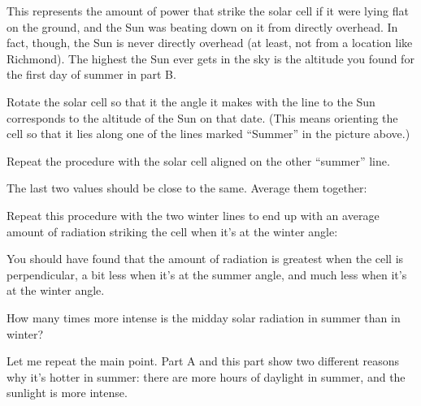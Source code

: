 \vskip 1in

This represents the amount of power that strike the solar cell
if it were lying flat on the ground, and the Sun was beating down
on it from directly overhead. In fact, though, the Sun is never
directly overhead (at least, not from a location like Richmond).
The highest the Sun ever gets in the sky is the altitude you found
for the first day of summer in part B.

Rotate the solar cell so that it the angle it makes with
the line to the Sun corresponds to the altitude of the
Sun on that date. (This means orienting the cell so that it
lies along one of the lines marked ``Summer'' in the picture above.)

\vskip 1in

Repeat the procedure with the solar cell aligned on the other ``summer''
line.  

\vskip 1in

The last two values should be close to the same.  Average them
together:

\vskip 1in

Repeat this procedure with the two winter lines to end
up with an average amount of radiation striking the cell
when it's at the winter angle:

\vskip 2in

You should have found that the amount of radiation is greatest
when the cell is perpendicular, a bit less when it's at the summer
angle, and much less when it's at the winter angle.

How many times more intense is the midday solar radiation in summer
than in winter?

\vskip 1in

Let me repeat the main point. Part A and this part 
show two different reasons why it's hotter in summer: there are more
hours of daylight in summer, and the sunlight is more intense.



